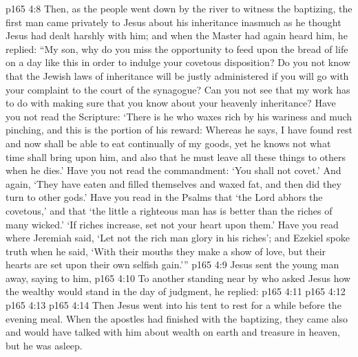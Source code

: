 \vs p165 4:8 \pc Then, as the people went down by the river to witness the baptizing, the first man came privately to Jesus about his inheritance inasmuch as he thought Jesus had dealt harshly with him; and when the Master had again heard him, he replied: “My son, why do you miss the opportunity to feed upon the bread of life on a day like this in order to indulge your covetous disposition? Do you not know that the Jewish laws of inheritance will be justly administered if you will go with your complaint to the court of the synagogue? Can you not see that my work has to do with making sure that you know about your heavenly inheritance? Have you not read the Scripture: ‘There is he who waxes rich by his wariness and much pinching, and this is the portion of his reward: Whereas he says, I have found rest and now shall be able to eat continually of my goods, yet he knows not what time shall bring upon him, and also that he must leave all these things to others when he dies.’ Have you not read the commandment: ‘You shall not covet.’ And again, ‘They have eaten and filled themselves and waxed fat, and then did they turn to other gods.’ Have you read in the Psalms that ‘the Lord abhors the covetous,’ and that ‘the little a righteous man has is better than the riches of many wicked.’ ‘If riches increase, set not your heart upon them.’ Have you read where Jeremiah said, ‘Let not the rich man glory in his riches’; and Ezekiel spoke truth when he said, ‘With their mouths they make a show of love, but their hearts are set upon their own selfish gain.’”
\vs p165 4:9 Jesus sent the young man away, saying to him, 
\vs p165 4:10 To another standing near by who asked Jesus how the wealthy would stand in the day of judgment, he replied: 
\vs p165 4:11 
\vs p165 4:12 
\vs p165 4:13 
\vs p165 4:14 \pc Then Jesus went into his tent to rest for a while before the evening meal. When the apostles had finished with the baptizing, they came also and would have talked with him about wealth on earth and treasure in heaven, but he was asleep.
